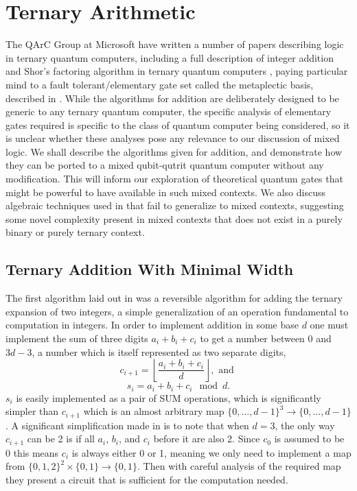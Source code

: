 \chapter[TERNARY ARITHMETIC]{Ternary Arithmetic}\label{ternary}
The QArC Group at Microsoft have written a number of papers describing logic in ternary quantum computers, including a full description of integer addition and Shor's factoring algorithm in ternary quantum computers \cite{arithmetics, shor-qutrit}, paying particular mind to a fault tolerant/elementary gate set called the metaplectic basis, described in \cite{universal-anyon, topological-anyon-thing}. While the algorithms for addition are deliberately designed to be generic to any ternary quantum computer, the specific analysis of elementary gates required is specific to the class of quantum computer being considered, so it is unclear whether these analyses pose any relevance to our discussion of mixed logic. We shall describe the algorithms given for addition, and demonstrate how they can be ported to a mixed qubit-qutrit quantum computer without any modification. This will inform our exploration of theoretical quantum gates that might be powerful to have available in such mixed contexts. We also discuss algebraic techniques used in \cite{arithmetics} that fail to generalize to mixed contexts, suggesting some novel complexity present in mixed contexts that does not exist in a purely binary or purely ternary context.

\section{Ternary Addition With Minimal Width}
The first algorithm laid out in \cite{arithmetics} was a reversible algorithm for adding the ternary expansion of two integers, a simple generalization of an operation fundamental to computation in integers. In order to implement addition in some base $d$ one must implement the sum of three digits $a_i + b_i + c_i$ to get a number between $0$ and $3d-3$, a number which is itself represented as two separate digits,
\[c_{i+1} = \left\lfloor \frac{a_i + b_i + c_i}{d} \right\rfloor, \text{\ and\ }
\]\[s_i = a_i + b_i + c_i \mod d.\]
$s_i$ is easily implemented as a pair of SUM operations, which is significantly simpler than $c_{i+1}$ which is an almost arbitrary map $\{0,\dots,d-1\}^3 \to \{0,\dots,d-1\}$. A significant simplification made in \cite{arithmetics} is to note that when $d=3$, the only way $c_{i+1}$ can be 2 is if all $a_i$, $b_i$, and $c_i$ before it are also 2. Since $c_0$ is assumed to be 0 this means $c_i$ is always either 0 or 1, meaning we only need to implement a map from $\{0,1,2\}^2\times\{0,1\} \to \{0, 1\}$. Then with careful analysis of the required map they present a circuit that is sufficient for the computation needed.

